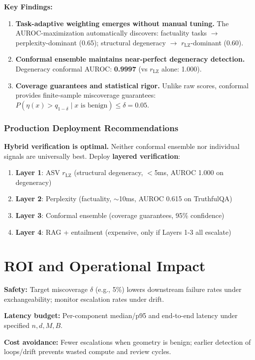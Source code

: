 \documentclass[11pt]{article}
\begin{document}
\textbf{Key Findings:}
\begin{enumerate}
\item \textbf{Task-adaptive weighting emerges without manual tuning.} The AUROC-maximization automatically discovers: factuality tasks $\rightarrow$ perplexity-dominant (0.65); structural degeneracy $\rightarrow$ $r_{\text{LZ}}$-dominant (0.60).
\item \textbf{Conformal ensemble maintains near-perfect degeneracy detection.} Degeneracy conformal AUROC: \textbf{0.9997} (vs $r_{\text{LZ}}$ alone: 1.000).
\item \textbf{Coverage guarantees and statistical rigor.} Unlike raw scores, conformal provides finite-sample miscoverage guarantees: $P(\eta(x) > q_{1-\delta} \mid x \text{ is benign}) \le \delta = 0.05$.
\end{enumerate}

\subsubsection{Production Deployment Recommendations}

\textbf{Hybrid verification is optimal.} Neither conformal ensemble nor individual signals are universally best. Deploy \textbf{layered verification}:
\begin{enumerate}
\item \textbf{Layer 1}: ASV $r_{\text{LZ}}$ (structural degeneracy, $<$5ms, AUROC 1.000 on degeneracy)
\item \textbf{Layer 2}: Perplexity (factuality, $\sim$10ms, AUROC 0.615 on TruthfulQA)
\item \textbf{Layer 3}: Conformal ensemble (coverage guarantees, 95\% confidence)
\item \textbf{Layer 4}: RAG + entailment (expensive, only if Layers 1-3 all escalate)
\end{enumerate}

\section{ROI and Operational Impact}
\label{sec:roi}

\textbf{Safety:} Target miscoverage $\delta$ (e.g., 5\%) lowers downstream failure rates under exchangeability; monitor escalation rates under drift.

\textbf{Latency budget:} Per-component median/p95 and end-to-end latency under specified $n, d, M, B$.

\textbf{Cost avoidance:} Fewer escalations when geometry is benign; earlier detection of loops/drift prevents wasted compute and review cycles.
\end{document}
